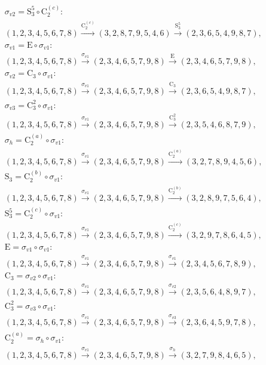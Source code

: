 \begin{align*}
& \sigma_{v2} = \mathrm{S}_{3}^{5} \circ \mathrm{C}_{2}^{(c)}:\; \\& (1,2,3,4,5,6,7,8) \xrightarrow{\mathrm{C}_{2}^{(c)}} (3,2,8,7,9,5,4,6) \xrightarrow{\mathrm{S}_{3}^{5}} (2,3,6,5,4,9,8,7), \\
& \sigma_{v1} = \mathrm{E} \circ \sigma_{v1}:\; \\& (1,2,3,4,5,6,7,8) \xrightarrow{\sigma_{v1}} (2,3,4,6,5,7,9,8) \xrightarrow{\mathrm{E}} (2,3,4,6,5,7,9,8), \\
& \sigma_{v2} = \mathrm{C}_{3} \circ \sigma_{v1}:\; \\& (1,2,3,4,5,6,7,8) \xrightarrow{\sigma_{v1}} (2,3,4,6,5,7,9,8) \xrightarrow{\mathrm{C}_{3}} (2,3,6,5,4,9,8,7), \\
& \sigma_{v3} = \mathrm{C}_{3}^{2} \circ \sigma_{v1}:\; \\& (1,2,3,4,5,6,7,8) \xrightarrow{\sigma_{v1}} (2,3,4,6,5,7,9,8) \xrightarrow{\mathrm{C}_{3}^{2}} (2,3,5,4,6,8,7,9), \\
& \sigma_{h} = \mathrm{C}_{2}^{(a)} \circ \sigma_{v1}:\; \\& (1,2,3,4,5,6,7,8) \xrightarrow{\sigma_{v1}} (2,3,4,6,5,7,9,8) \xrightarrow{\mathrm{C}_{2}^{(a)}} (3,2,7,8,9,4,5,6), \\
& \mathrm{S}_{3} = \mathrm{C}_{2}^{(b)} \circ \sigma_{v1}:\; \\& (1,2,3,4,5,6,7,8) \xrightarrow{\sigma_{v1}} (2,3,4,6,5,7,9,8) \xrightarrow{\mathrm{C}_{2}^{(b)}} (3,2,8,9,7,5,6,4), \\
& \mathrm{S}_{3}^{5} = \mathrm{C}_{2}^{(c)} \circ \sigma_{v1}:\; \\& (1,2,3,4,5,6,7,8) \xrightarrow{\sigma_{v1}} (2,3,4,6,5,7,9,8) \xrightarrow{\mathrm{C}_{2}^{(c)}} (3,2,9,7,8,6,4,5), \\
& \mathrm{E} = \sigma_{v1} \circ \sigma_{v1}:\; \\& (1,2,3,4,5,6,7,8) \xrightarrow{\sigma_{v1}} (2,3,4,6,5,7,9,8) \xrightarrow{\sigma_{v1}} (2,3,4,5,6,7,8,9), \\
& \mathrm{C}_{3} = \sigma_{v2} \circ \sigma_{v1}:\; \\& (1,2,3,4,5,6,7,8) \xrightarrow{\sigma_{v1}} (2,3,4,6,5,7,9,8) \xrightarrow{\sigma_{v2}} (2,3,5,6,4,8,9,7), \\
& \mathrm{C}_{3}^{2} = \sigma_{v3} \circ \sigma_{v1}:\; \\& (1,2,3,4,5,6,7,8) \xrightarrow{\sigma_{v1}} (2,3,4,6,5,7,9,8) \xrightarrow{\sigma_{v3}} (2,3,6,4,5,9,7,8), \\
& \mathrm{C}_{2}^{(a)} = \sigma_{h} \circ \sigma_{v1}:\; \\& (1,2,3,4,5,6,7,8) \xrightarrow{\sigma_{v1}} (2,3,4,6,5,7,9,8) \xrightarrow{\sigma_{h}} (3,2,7,9,8,4,6,5), \\

\end{align*}
